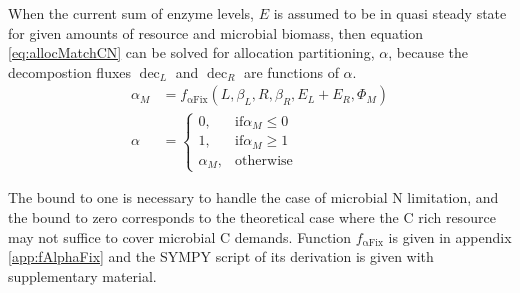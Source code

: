 When the current sum of enzyme levels, $E$ is assumed to be in quasi
steady state for given amounts of resource and microbial biomass, then equation
\ref{eq:allocMatchCN} can be solved for allocation partitioning, $\alpha$,
because the decompostion fluxes $\operatorname{dec}_L$ and
$\operatorname{dec}_R$ are functions of $\alpha$.
\begin{subequations}
\label{eq:allocMatch} 
\begin{align}
\alpha_M &= f_{\operatorname{{\alpha}Fix}}(L,\beta_L,R,\beta_R, E_L + E_R,
\Phi_M)
\\
\alpha &= \begin{cases}
  0,  & \text{if} \alpha_M \le 0 \\
  1,  & \text{if} \alpha_M \ge 1 \\
  \alpha_M, & \text{otherwise}
\end{cases}   
\end{align}
\end{subequations} 

\noindent
The bound to one is necessary to handle the case of microbial N
limitation, and the bound to zero corresponds to the theoretical case where the
C rich resource may not suffice to cover microbial C demands. 
Function $f_{\operatorname{{\alpha}Fix}}$ is given in appendix
\ref{app:fAlphaFix} and the SYMPY script of its 
derivation is given with supplementary material. 


